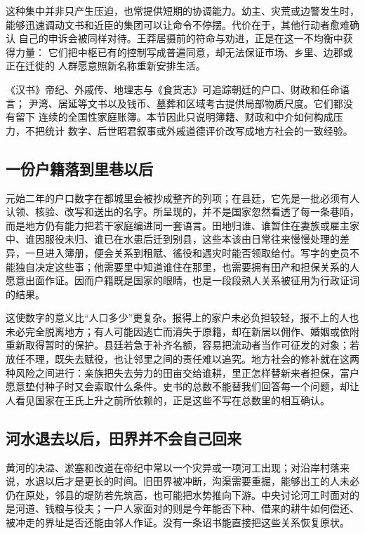 这种集中并非只产生压迫，也常提供短期的协调能力。幼主、灾荒或边警发生时，
能够迅速调动文书和近臣的集团可以让命令不停摆。代价在于，其他行动者愈难确认
自己的申诉会被同样对待。王莽居摄前的符命与劝进，正是在这一不均衡中获得力量：
它们把中枢已有的控制写成普遍同意，却无法保证市场、乡里、边郡或正在迁徙的
人群愿意照新名称重新安排生活。

\begin{sourcenote}[晚西汉地方史能说到哪里]
《汉书》帝纪、外戚传、地理志与《食货志》可追踪朝廷的户口、财政和任命语言；
尹湾、居延等文书以及钱币、墓葬和区域考古提供局部物质尺度。它们都没有留下
连续的全国性家庭账簿。本节因此只说明簿籍、财政和中介如何构成压力，不把统计
数字、后世昭君叙事或外戚道德评价改写成地方社会的一致经验。
\end{sourcenote}

\subsection{一份户籍落到里巷以后}

元始二年的户口数字在都城里会被抄成整齐的列项；在县廷，它先是一批必须有人认领、核验、改写和送出的名字。所呈现的，并不是国家忽然看透了每一条巷陌，而是地方仍有能力把若干家庭编进同一套语言。田地归谁、谁暂住在妻族或雇主家中、谁因服役未归、谁已在水患后迁到别县，这些本该由日常往来慢慢处理的差异，一旦进入簿册，便会关系到租赋、徭役和遇灾时能否领取给付。写字的吏员不能独自决定这些事；他需要里中知道谁住在那里，也需要拥有田产和担保关系的人愿意出面作证。因而户籍既是国家的眼睛，也是一段段熟人关系被征用为行政证词的结果。

这使数字的意义比“人口多少”更复杂。报得上的家户未必负担较轻，报不上的人也未必完全脱离地方；有人可能因逃亡而消失于原籍，却在新居以佣作、婚姻或依附重新取得暂时的保护。县廷若急于补齐名额，容易把流动者当作可征发的对象；若放任不理，既失去赋役，也让邻里之间的责任难以追究。地方社会的修补就在这两种风险之间进行：亲族把失去劳力的田亩交给谁耕，里正怎样替新来者担保，富户愿意垫付种子时又会索取什么条件。史书的总数不能替我们回答每一个问题，却让人看见国家在王氏上升之前所依赖的，正是这些不写在总数里的相互确认。

\subsection{河水退去以后，田界并不会自己回来}

黄河的决溢、淤塞和改道在帝纪中常以一个灾异或一项河工出现；对沿岸村落来说，水退以后才是更长的时间。旧田界被冲断，沟渠需要重掘，能够出工的人未必仍在原处，邻县的堤防若先筑高，也可能把水势推向下游。中央讨论河工时面对的是河道、钱粮与役夫；一户人家面对的则是今年能否下种、借来的耕牛如何偿还、被冲走的界址是否还能由邻人作证。没有一条诏书能直接把这些关系恢复原状。

